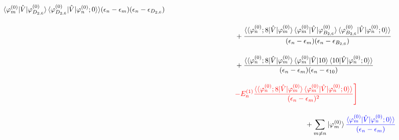 \begin{align}
{{    \langle{\varphi^{(0)}_{m}|\hat{V}|\varphi^{(0)}_{D_{2,6}}}\rangle
    \braket{\varphi^{(0)}_{D_{2,6}}|\hat{V}|\varphi^{(0)}_n;0}\rangle}
    {(\epsilon_n-\epsilon_m)(\epsilon_n-\epsilon_{D_{2,6}})}}\nn[10pt]
    &\hspace{100pt}
    +{\frac{\langle\braket{\varphi^{(0)}_{n};8|\hat{V}|\varphi^{(0)}_m}
    \langle{\varphi^{(0)}_{m}|\hat{V}|\varphi^{(0)}_{B_{2,6}}}\rangle
    \braket{\varphi^{(0)}_{B_{2,6}}|\hat{V}|\varphi^{(0)}_n;0}\rangle}
    {(\epsilon_n-\epsilon_m)(\epsilon_n-\epsilon_{B_{2,6}})}}\nn[10pt]
    &\hspace{100pt}
    +{\frac{\langle\braket{\varphi^{(0)}_{n};8|\hat{V}|\varphi^{(0)}_m}
    \langle{\varphi^{(0)}_{m}|\hat{V}|10}\rangle
    \braket{10|\hat{V}|\varphi^{(0)}_n;0}\rangle}
    {(\epsilon_n-\epsilon_m)(\epsilon_n-\epsilon_{10})}}\nn[10pt]
    &\hspace{100pt}
    \textcolor{red}{-E^{(1)}_n
    \frac{\langle\braket{\varphi^{(0)}_{n};8|\hat{V}|\varphi^{(0)}_m}
    \braket{\varphi^{(0)}_{m}|\hat{V}|\varphi^{(0)}_n;0}\rangle}{(\epsilon_n-\epsilon_m)^2}
    \Biggr]}
    \nn[10pt]
    &\hspace{200pt}+
    \sum_{m\neq n}\ket{\varphi^{(0)}_m}
    \textcolor{blue}{
    \frac{\braket{\varphi^{(0)}_{m}|\hat{V}|\varphi^{(0)}_n;0}\rangle}{(\epsilon_n-\epsilon_m)}}
\end{align}



